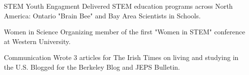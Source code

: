 

\begin{cvskills}

 \cvskill
 {STEM Youth Engagment}
 {Delivered STEM education programs across North America: Ontario "Brain Bee" and Bay Area Scientists in Schools.} %
 
 \cvskill
 {Women in Science}
 {Organizing member of the first "Women in STEM" conference at Western University.} 
 
 \cvskill
 {Communication}
 {Wrote 3 articles for The Irish Times on living and studying in the U.S. Blogged for the Berkeley Blog and JEPS Bulletin.} %
 
\end{cvskills}
